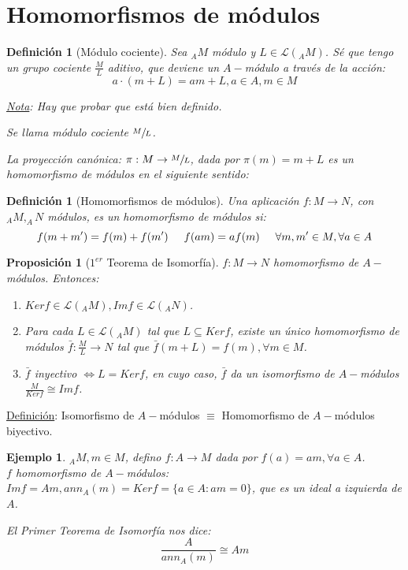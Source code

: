 \documentclass[11pt,a4paper]{article}
\theoremstyle{break}
\newtheorem{example}[theorem]{Ejemplo}
\newtheorem{definition}[theorem]{Definición}
\newtheorem{proposition}[theorem]{Proposición}
\begin{document}
\newpage

\section{Homomorfismos de módulos}

\begin{definition}[Módulo cociente]
Sea $_{A}M$ módulo y $L \in \mathcal{L}(_{A}M)$. Sé que tengo un grupo cociente $\frac{M}{L}$ aditivo, que deviene un $A-$módulo a través de la acción:
$$a \cdot (m + L) = am + L, a \in A, m \in M$$

\underline{Nota}: Hay que probar que está bien definido.

Se llama módulo cociente $\sfrac{M}{L}$.

La proyección canónica: $\pi: M \to \sfrac{M}{L}$, dada por $\pi(m) = m+L$ es un homomorfismo de módulos en el siguiente sentido:
\end{definition}

\begin{definition}[Homomorfismos de módulos]
Una aplicación $f: M \to N$, con $_{A}M, _{A}N$ módulos, es un homomorfismo de módulos si:
$$f(m+m') = f(m) + f(m') \hspace{0.5cm} f(am) = af(m) \hspace{0.5cm} \forall m, m' \in M, \forall a \in A$$
\end{definition}

\begin{proposition}[$1^{er}$ Teorema de Isomorfía]
$f: M \to N$ homomorfismo de $A-$módulos. Entonces:
\begin{enumerate}
\item $Ker f \in \mathcal{L} (_{A}M), Im f \in \mathcal{L}(_{A}N)$.
\item Para cada $L \in  \mathcal{L} (_{A}M)$ tal que $L \subseteq Ker f$, existe un único homomorfismo de módulos $\bar{f}: \frac{M}{L} \to N$ tal que $\bar{f}(m + L) = f(m), \forall m \in M$.
\item $\bar{f}$ inyectivo $\iff L = Ker f$, en cuyo caso, $\bar{f}$ da un isomorfismo de $A-$módulos $\frac{M}{Ker f} \cong Im f$.
\end{enumerate}
\end{proposition}

\underline{Definición}: Isomorfismo de $A-$módulos $\equiv$ Homomorfismo de $A-$módulos biyectivo.

\begin{example}
$_{A}M, m \in M$, defino $f: A \to M$ dada por $f(a) = am, \forall a \in A$. \\
$f$ homomorfismo de $A-$módulos: $Im f = Am, ann_{A} (m) = Ker f = \{a \in A: am = 0\}$, que es un ideal a izquierda de $A$.

El Primer Teorema de Isomorfía nos dice:
$$\frac{A}{ann_{A}(m)} \cong Am$$
\end{example}
\end{document}
